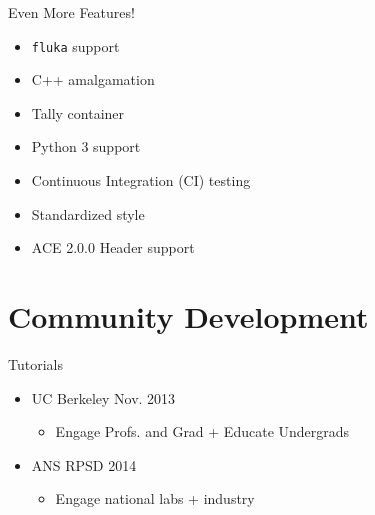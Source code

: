 \documentclass[xcolor=x11names,compress]{beamer}
\begin{document}
\begin{frame}{Even More Features!}
  \Large
    \begin{itemize}
        \item \texttt{fluka} support
        \item C++ amalgamation
        \item Tally container
        \item Python 3 support
        \item Continuous Integration (CI) testing
        \item Standardized style
        \item ACE 2.0.0 Header support
    \end{itemize}
\end{frame}




\section{Community Development}

\begin{frame}{Tutorials}
  \Large
    \begin{itemize}
        \item UC Berkeley Nov. 2013
        \begin{itemize}
            \item Engage Profs. and Grad + Educate Undergrads
        \end{itemize}
        \item ANS RPSD 2014
        \begin{itemize}
            \item Engage national labs + industry
        \end{itemize}
    \end{itemize}
\end{frame}
\end{document}
